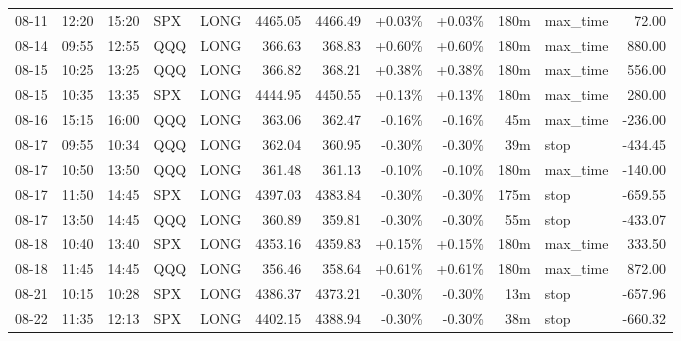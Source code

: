 \documentclass[11pt,a4paper]{article}
\begin{document}
\begin{center}
\begin{longtable}{>{\color{txtmain}}l l l l l r r r r r >{\color{txtmain}}l r}
08-11 & 12:20 & 15:20 & SPX & LONG & 4465.05 & 4466.49 & \textcolor{wingreen}{+0.03\%} & \textcolor{wingreen}{+0.03\%} & 180m & max\_time & \textcolor{wingreen}{72.00} \\
08-14 & 09:55 & 12:55 & QQQ & LONG & 366.63 & 368.83 & \textcolor{wingreen}{+0.60\%} & \textcolor{wingreen}{+0.60\%} & 180m & max\_time & \textcolor{wingreen}{880.00} \\
08-15 & 10:25 & 13:25 & QQQ & LONG & 366.82 & 368.21 & \textcolor{wingreen}{+0.38\%} & \textcolor{wingreen}{+0.38\%} & 180m & max\_time & \textcolor{wingreen}{556.00} \\
08-15 & 10:35 & 13:35 & SPX & LONG & 4444.95 & 4450.55 & \textcolor{wingreen}{+0.13\%} & \textcolor{wingreen}{+0.13\%} & 180m & max\_time & \textcolor{wingreen}{280.00} \\
08-16 & 15:15 & 16:00 & QQQ & LONG & 363.06 & 362.47 & \textcolor{lossred}{-0.16\%} & \textcolor{lossred}{-0.16\%} & 45m & max\_time & \textcolor{lossred}{-236.00} \\
08-17 & 09:55 & 10:34 & QQQ & LONG & 362.04 & 360.95 & \textcolor{lossred}{-0.30\%} & \textcolor{lossred}{-0.30\%} & 39m & stop & \textcolor{lossred}{-434.45} \\
08-17 & 10:50 & 13:50 & QQQ & LONG & 361.48 & 361.13 & \textcolor{lossred}{-0.10\%} & \textcolor{lossred}{-0.10\%} & 180m & max\_time & \textcolor{lossred}{-140.00} \\
08-17 & 11:50 & 14:45 & SPX & LONG & 4397.03 & 4383.84 & \textcolor{lossred}{-0.30\%} & \textcolor{lossred}{-0.30\%} & 175m & stop & \textcolor{lossred}{-659.55} \\
08-17 & 13:50 & 14:45 & QQQ & LONG & 360.89 & 359.81 & \textcolor{lossred}{-0.30\%} & \textcolor{lossred}{-0.30\%} & 55m & stop & \textcolor{lossred}{-433.07} \\
08-18 & 10:40 & 13:40 & SPX & LONG & 4353.16 & 4359.83 & \textcolor{wingreen}{+0.15\%} & \textcolor{wingreen}{+0.15\%} & 180m & max\_time & \textcolor{wingreen}{333.50} \\
08-18 & 11:45 & 14:45 & QQQ & LONG & 356.46 & 358.64 & \textcolor{wingreen}{+0.61\%} & \textcolor{wingreen}{+0.61\%} & 180m & max\_time & \textcolor{wingreen}{872.00} \\
08-21 & 10:15 & 10:28 & SPX & LONG & 4386.37 & 4373.21 & \textcolor{lossred}{-0.30\%} & \textcolor{lossred}{-0.30\%} & 13m & stop & \textcolor{lossred}{-657.96} \\
08-22 & 11:35 & 12:13 & SPX & LONG & 4402.15 & 4388.94 & \textcolor{lossred}{-0.30\%} & \textcolor{lossred}{-0.30\%} & 38m & stop & \textcolor{lossred}{-660.32} \\

\end{longtable}
\end{center}
\end{document}
